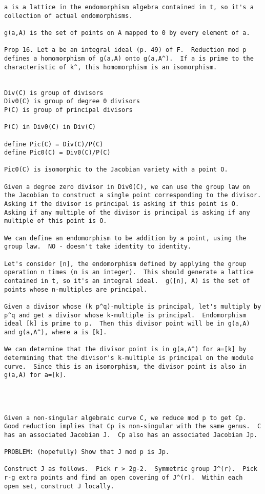 {\begin{verbatim}
a is a lattice in the endomorphism algebra contained in t, so it's a
collection of actual endomorphisms.

g(a,A) is the set of points on A mapped to 0 by every element of a.

Prop 16. Let a be an integral ideal (p. 49) of F.  Reduction mod p
defines a homomorphism of g(a,A) onto g(a,A^).  If a is prime to the
characteristic of k^, this homomorphism is an isomorphism.


Div(C) is group of divisors
Div0(C) is group of degree 0 divisors
P(C) is group of principal divisors

P(C) in Div0(C) in Div(C)

define Pic(C) = Div(C)/P(C)
define Pic0(C) = Div0(C)/P(C)

Pic0(C) is isomorphic to the Jacobian variety with a point O.

Given a degree zero divisor in Div0(C), we can use the group law on
the Jacobian to construct a single point corresponding to the divisor.
Asking if the divisor is principal is asking if this point is O.
Asking if any multiple of the divisor is principal is asking if any
multiple of this point is O.

We can define an endomorphism to be addition by a point, using the
group law.  NO - doesn't take identity to identity.

Let's consider [n], the endomorphism defined by applying the group
operation n times (n is an integer).  This should generate a lattice
contained in t, so it's an integral ideal.  g([n], A) is the set of
points whose n-multiples are principal.

Given a divisor whose (k p^q)-multiple is principal, let's multiply by
p^q and get a divisor whose k-multiple is principal.  Endomorphism
ideal [k] is prime to p.  Then this divisor point will be in g(a,A)
and g(a,A^), where a is [k].

We can determine that the divisor point is in g(a,A^) for a=[k] by
determining that the divisor's k-multiple is principal on the module
curve.  Since this is an isomorphism, the divisor point is also in
g(a,A) for a=[k].




Given a non-singular algebraic curve C, we reduce mod p to get Cp.
Good reduction implies that Cp is non-singular with the same genus.  C
has an associated Jacobian J.  Cp also has an associated Jacobian Jp.

PROBLEM: (hopefully) Show that J mod p is Jp.

Construct J as follows.  Pick r > 2g-2.  Symmetric group J^(r).  Pick
r-g extra points and find an open covering of J^(r).  Within each
open set, construct J locally.

\end{verbatim}
}
